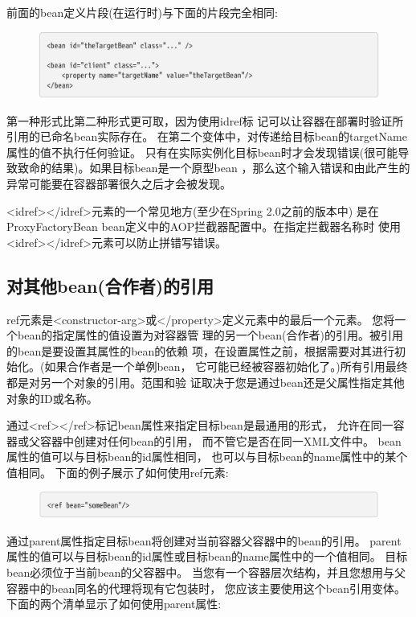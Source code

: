 前面的bean定义片段(在运行时)与下面的片段完全相同:

\begin{figure}[ht]
    \centering
    \includegraphics[width=1\linewidth]{./Figure/IMG_code_36.png}
\end{figure}

第一种形式比第二种形式更可取，因为使用idref标
记可以让容器在部署时验证所引用的已命名bean实际存在。
在第二个变体中，对传递给目标bean的targetName属性的值不执行任何验证。
只有在实际实例化目标bean时才会发现错误(很可能导致致命的结果)。如果目标bean是一个原型bean
，那么这个输入错误和由此产生的异常可能要在容器部署很久之后才会被发现。

<idref></idref>元素的一个常见地方(至少在Spring 2.0之前的版本中)
是在ProxyFactoryBean bean定义中的AOP拦截器配置中。在指定拦截器名称时
使用<idref></idref>元素可以防止拼错写错误。

\subsection{对其他bean(合作者)的引用}
ref元素是<constructor-arg>或</property>定义元素中的最后一个元素。
您将一个bean的指定属性的值设置为对容器管
理的另一个bean(合作者)的引用。被引用的bean是要设置其属性的bean的依赖
项，在设置属性之前，根据需要对其进行初始化。(如果合作者是一个单例bean，
它可能已经被容器初始化了。)所有引用最终都是对另一个对象的引用。范围和验
证取决于您是通过bean还是父属性指定其他对象的ID或名称。

通过<ref></ref>标记bean属性来指定目标bean是最通用的形式，
允许在同一容器或父容器中创建对任何bean的引用，
而不管它是否在同一XML文件中。
bean属性的值可以与目标bean的id属性相同，
也可以与目标bean的name属性中的某个值相同。
下面的例子展示了如何使用ref元素:

\begin{figure}[ht]
    \centering
    \includegraphics[width=1\linewidth]{./Figure/IMG_code_37.png}
\end{figure}

通过parent属性指定目标bean将创建对当前容器父容器中的bean的引用。
parent属性的值可以与目标bean的id属性或目标bean的name属性中的一个值相同。
目标bean必须位于当前bean的父容器中。
当您有一个容器层次结构，并且您想用与父容器中的bean同名的代理将现有它包装时，
您应该主要使用这个bean引用变体。下面的两个清单显示了如何使用parent属性:

